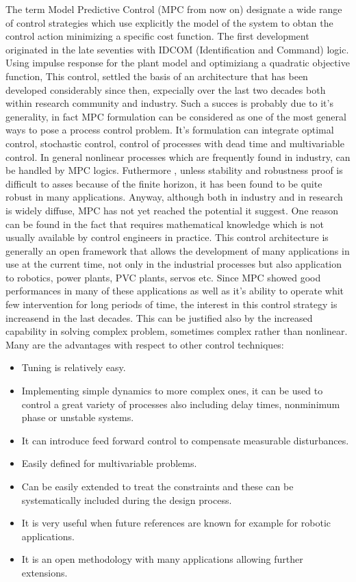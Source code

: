 The term Model Predictive Control (MPC from now on) designate a wide range of control strategies which use explicitly the model of the system to obtan the control action minimizing a specific cost function. The first development originated in the late seventies with IDCOM (Identification and Command) logic. Using impulse response for the plant model and optimiziang a quadratic objective function, This control, settled the basis of an architecture that has been developed considerably since then, expecially over the last two decades both within research community and industry.
Such a succes is probably due to it's generality, in fact MPC formulation can be considered as one of the most general ways to pose a process control problem. It's formulation can integrate optimal control, stochastic control, control of processes with dead time and multivariable control. In general nonlinear processes which are frequently found in industry, can be handled by MPC logics. Futhermore , unless stability and robustness proof is difficult to asses because of the finite horizon, it has been found to be quite robust in many applications. Anyway, although both in industry and in research is widely diffuse, MPC has not yet reached the potential it suggest. One reason can be found in the fact that requires mathematical knowledge which is not usually available by control engineers in practice. This control architecture is generally an open framework that allows the development of many applications in use at the current
time, not only in the industrial processes but also application to robotics, power plants, PVC plants, servos etc. Since MPC showed good performances in many of these applications as well as it's ability to operate whit few intervention for long periods of time, the interest in this control strategy is increasend in the last decades. This can be justified also by the increased capability in solving complex problem, sometimes complex rather than nonlinear. Many are the advantages with respect to other control techniques: \\

\begin{itemize}
\item Tuning is relatively easy.
\item Implementing simple dynamics to more complex ones, it can be used to control a great variety of processes also including delay times, nonminimum phase or unstable systems.
\item It can introduce feed forward control to compensate measurable disturbances.
\item Easily defined for multivariable problems.
\item Can be easily extended to treat the constraints and these can be systematically included during the design process.
\item It is very useful when future references are
known for example for robotic applications.
\item It is an open methodology with many applications allowing further extensions.
\end{itemize}


